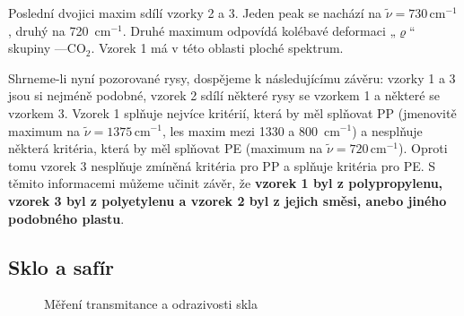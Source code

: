 \documentclass[10pt,a4paper]{article}
\renewcommand{\U}[1]{\ensuremath{\,\mathrm{#1}}}
\newcommand{\°}{\degree}
\begin{document}
Poslední dvojici maxim sdílí vzorky 2 a 3. Jeden peak se nachází na $\tilde\nu = 730 \U{cm^{-1}}$, druhý na 720 \U{cm^{-1}}. Druhé maximum odpovídá kolébavé deformaci „$\varrho$“ skupiny —CO$_2$. Vzorek 1 má v této oblasti ploché spektrum.

Shrneme-li nyní pozorované rysy, dospějeme k následujícímu závěru: vzorky 1 a 3 jsou si nejméně podobné, vzorek 2 sdílí některé rysy se vzorkem 1 a některé se vzorkem 3. Vzorek 1 splňuje nejvíce kritérií, která by měl splňovat PP (jmenovitě maximum na $\tilde\nu = 1375 \U{cm^{-1}}$, les maxim mezi 1330 a 800 \U{cm^{-1}}) a nesplňuje některá kritéria, která by měl splňovat PE (maximum na $\tilde\nu = 720 \U{cm^{-1}}$). Oproti tomu vzorek 3 nesplňuje zmíněná kritéria pro PP a splňuje kritéria pro PE. S těmito informacemi můžeme učinit závěr, že \textbf{vzorek 1 byl z polypropylenu, vzorek 3 byl z polyetylenu a vzorek 2 byl z jejich směsi, anebo jiného podobného plastu}.


\subsection{Sklo a safír}

\begin{figure}[p]
    \centering
    \caption{Měření transmitance a odrazivosti skla}
    \label{sklo-trans-refl}
\end{figure}
\end{document}
